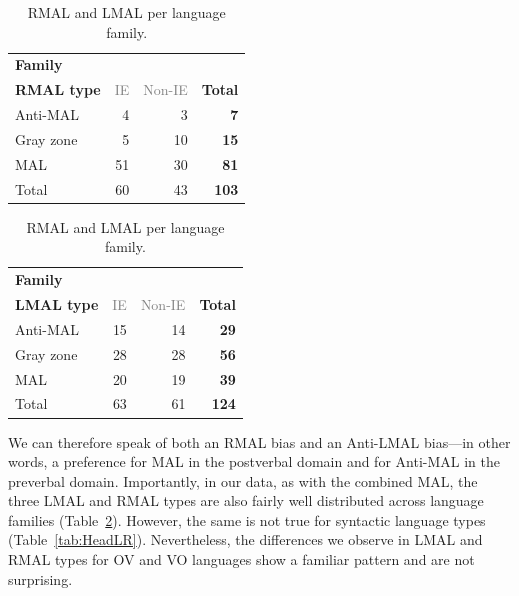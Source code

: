 \begin{table}[!ht]
\begin{center}
\begin{tabular}{l r r r}
\toprule
\textbf{Family} & & & \\
\textbf{RMAL type} & \textcolor{gray}{IE} & \textcolor{gray}{Non-IE} & \textcolor{totalgreen}{\textbf{Total}} \\
\midrule
\rowcolor{rowred} Anti-MAL & 4 & 3 & \textcolor{totalgreen}{\textbf{7}} \\
\rowcolor{rowyellow} Gray zone & 5 & 10 & \textcolor{totalgreen}{\textbf{15}} \\
\rowcolor{rowgreen} MAL & 51 & 30 & \textcolor{totalgreen}{\textbf{81}} \\
\rowcolor{rowgray} Total & 60 & 43 & \textcolor{totalgreen}{\textbf{103}} \\
\bottomrule
\end{tabular}


\vspace{6pt}

\begin{tabular}{l r r r}
\toprule
\textbf{Family} & & & \\
\textbf{LMAL type} & \textcolor{gray}{IE} & \textcolor{gray}{Non-IE} & \textcolor{totalgreen}{\textbf{Total}} \\
\midrule
\rowcolor{rowred} Anti-MAL & 15 & 14 & \textcolor{totalgreen}{\textbf{29}} \\
\rowcolor{rowyellow} Gray zone & 28 & 28 & \textcolor{totalgreen}{\textbf{56}} \\
\rowcolor{rowgreen} MAL & 20 & 19 & \textcolor{totalgreen}{\textbf{39}} \\
\rowcolor{rowgray} Total & 63 & 61 & \textcolor{totalgreen}{\textbf{124}} \\
\bottomrule
\end{tabular}
\caption{RMAL and LMAL per language family.}
\label{tab:FamLR}
\end{center}
\end{table}

We can therefore speak of both an RMAL bias and an Anti-LMAL bias---in other words, a preference for MAL in the postverbal domain and for Anti-MAL in the preverbal domain. Importantly, in our data, as with the combined MAL, the three LMAL and RMAL types are also fairly well distributed across language families (Table~\ref{tab:FamLR}). However, the same is not true for syntactic language types (Table~\ref{tab:HeadLR}). Nevertheless, the differences we observe in LMAL and RMAL types for OV and VO languages show a familiar pattern and are not surprising. 

